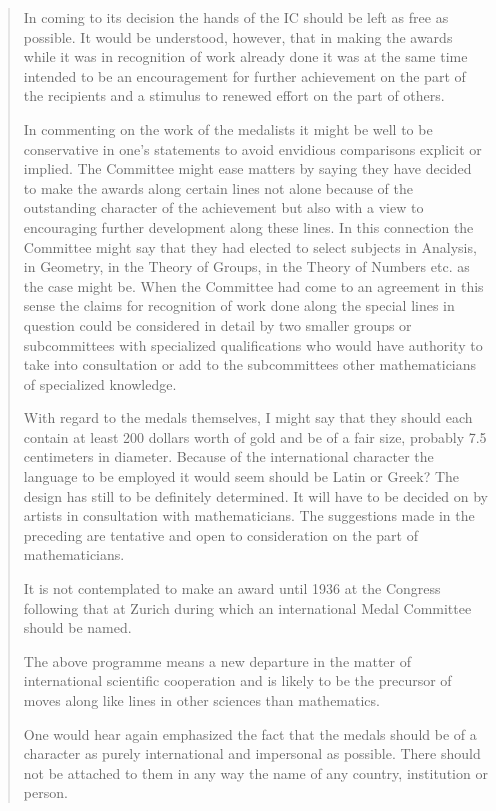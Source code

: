 \begin{quote}
  In coming to its decision the hands of the IC should be left as free as
possible. It would be understood, however, that in making the awards while
it was in recognition of work already done it was at the same time intended
to be an encouragement for further achievement on the part of the
recipients and a stimulus to renewed effort on the part of others.

 In commenting on the work of the medalists it might be well to be
conservative in one's statements to avoid envidious comparisons explicit or
implied. The Committee might ease matters by saying they have decided to
make the awards along certain lines not alone because of the outstanding
character of the achievement but also with a view to encouraging further
development along these lines. In this connection the Committee might say
that they had elected to select subjects in Analysis, in Geometry, in the
Theory of Groups, in the Theory of Numbers etc. as the case might be. When
the Committee had come to an agreement in this sense the claims for
recognition of work done along the special lines in question could be
considered in detail by two smaller groups or subcommittees with
specialized qualifications who would have authority to take into
consultation or add to the subcommittees other mathematicians of
specialized knowledge.

  With regard to the medals themselves, I might say that they should each
contain at least 200 dollars worth of gold and be of a fair size, probably
7.5 centimeters in diameter. Because of the international character the
language to be employed it would seem should be Latin or Greek? The design
has still to be definitely determined. It will have to be decided on by
artists in consultation with mathematicians. The suggestions made in the
preceding are tentative and open to consideration on the part of
mathematicians.

  It is not contemplated to make an award until 1936 at the Congress
following that at Zurich during which an international Medal Committee
should be named.

  The above programme means a new departure in the matter of international
scientific cooperation and is likely to be the precursor of moves along
like lines in other sciences than mathematics.

  One would hear again emphasized the fact that the medals should be of a
character as purely international and impersonal as possible. There should
not be attached to them in any way the name of any country, institution or
person.


\end{quote}
